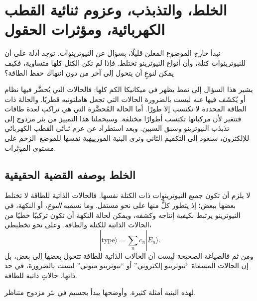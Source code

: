 \chapter{الخلط، والتذبذب، وعزوم ثنائية القطب الكهربائية، ومؤثرات الحقول}

نبدأ خارج الموضوع المعلن قليلًا، بسؤال عن النيوترينوات. توجد أدلة على أن للنيوترينوات كتلة، وأن أنواع النيوترينو تختلط. فإذا لم تكن الكتل كلها متساوية، فكيف يمكن لنوعٍ أن يتحول إلى آخر من دون انتهاك حفظ الطاقة؟

يشير هذا السؤال إلى نمط يظهر في ميكانيكا الكم كلها: فالحالات التي يُحضَّر فيها نظام أو يُكشَف فيها عنه ليست بالضرورة الحالات التي تجعل هاملتونيه قطريًا. والحالة ذات الطاقة المحددة لا تكتسب إلا طورًا. أما الحالة المُحضَّرة التي هي تراكب لعدة طاقات فتتغير لأن مركباتها تكتسب أطوارًا مختلفة. وسيحملنا هذا التمييز من بئر مزدوج إلى تذبذب النيوترينو وسبق السبين. وبعد استطراد عن عزم ثنائي القطب الكهربائي للإلكترون، سنعود إلى التكميم الثاني ونرى البنية الفورييهية نفسها للموضع--الزخم على مستوى المؤثرات.

\section{الخلط بوصفه القضية الحقيقية}

لا يلزم أن تكون جميع النيوترينوات ذات الكتلة نفسها. فالحالات الذاتية للطاقة لا تختلط بعضها ببعض؛ إذ يتطور كلٌّ منها على نحو مستقل. وما نسميه \emph{النوع}، أو النكهة، في النيوترينو يرتبط بكيفية إنتاجه وكشفه، ويمكن لحالة النكهة أن تكون تركيبًا خطيًا من الحالات الذاتية للكتلة والطاقة. وعلى نحو تخطيطي،
\begin{equation}
|\text{type}\rangle = \sum_n c_n |E_n\rangle .
\end{equation}
ومن ثم فالصياغة الصحيحة ليست أن الحالات الذاتية للطاقة تتحول بعضها إلى بعض، بل إن الحالات المسماة ``نيوترينو إلكتروني'' أو ``نيوترينو ميوني'' ليست بالضرورة، في حد ذاتها، حالاتٍ ذاتية للطاقة.

\begin{classroomqa}
\end{classroomqa}

لهذه البنية أمثلة كثيرة. وأوضحها يبدأ بجسيم في بئر مزدوج متناظر.

